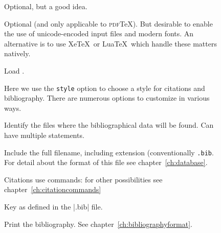 \begin{figure}
\begin{minipage}[t]{0.7\linewidth}
   Optional,
  but a good idea.

  \vspace{1pc} 
  Optional (and only applicable to \textsc{pdf}\TeX). But
  desirable to enable the use of unicode-encoded input files and
  modern fonts. An alternative is to use Xe\TeX\ or Lua\TeX\, which
  handle these matters natively.

  \vspace{1pc}

   Load \biblatex.
  \vspace{1pc}
  
  Here we use the
  \texttt{style} option to choose a style for citations
  and
  bibliography. There are numerous options to customize in various ways.

  \vspace{1pc}
  \strut{}
  Identify the files where the bibliographical data will be found. Can
  have multiple  statements.
  
  \vspace{0.5pc}
   Include the
  full filename, including extension (conventionally
  \texttt{.bib}. For detail about the format of this file see chapter~\ref{ch:database}.

  \vspace{1.3pc}
   Citations use
   commands: for other possibilities see
  chapter~\ref{ch:citationcommands}

  \vspace{2.2pc}
   Key as defined in
  the |.bib| file.

  \vspace{2pc}
   Print
  the bibliography. See chapter~\ref{ch:bibliographyformat}.


\end{minipage}
\end{figure}

